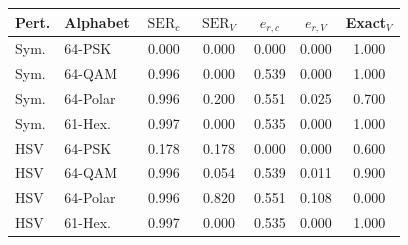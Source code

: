 \begin{tabular}{llccccc}
\toprule
Pert. & Alphabet & $\operatorname{SER}_{c}$ & $\operatorname{SER}_{V}$ & $e_{r,c}$ & $e_{r,V}$ & Exact$_V$ \\
\midrule
Sym. & 64-PSK & 0.000 & 0.000 & 0.000 & 0.000 & 1.000 \\
Sym. & 64-QAM & 0.996 & 0.000 & 0.539 & 0.000 & 1.000 \\
Sym. & 64-Polar & 0.996 & 0.200 & 0.551 & 0.025 & 0.700 \\
Sym. & 61-Hex. & 0.997 & 0.000 & 0.535 & 0.000 & 1.000 \\
\midrule
HSV & 64-PSK & 0.178 & 0.178 & 0.000 & 0.000 & 0.600 \\
HSV & 64-QAM & 0.996 & 0.054 & 0.539 & 0.011 & 0.900 \\
HSV & 64-Polar & 0.996 & 0.820 & 0.551 & 0.108 & 0.000 \\
HSV & 61-Hex. & 0.997 & 0.000 & 0.535 & 0.000 & 1.000 \\
\bottomrule
\end{tabular}

